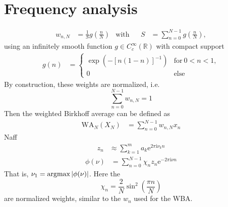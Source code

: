\documentclass[english, parskip=full]{scrartcl}
\title{\titel}
\author{\autor}
\date{\today}
\newcommand{\kla}{}
\newcommand{\klam}{}
\newcommand{\tecxt}{}
\def\I{\text{i}}
\def\E{\text{e}}
\begin{document}
\maketitle  %

\section{Frequency analysis}
\begin{align*}
w_{n,N}&=\frac{1}{S}g\kla\left( {\frac{n}{N}} \right)&\tecxt\text{with}&&S&=\sum_{n=0}^{N-1}g\kla\left( {\frac{n}{N}} \right),
\end{align*} 
using an infinitely smooth function $g\in C^\infty_c (\mathbb{R})$ with compact support
\begin{align*}
g(n)&=\begin{cases}
\exp\kla\left( {-\klam\left[ {n(1-n)} \right]^{-1}} \right)&\tecxt\text{for}\ 0<n<1,\\
0&\tecxt\text{else}
\end{cases}
\end{align*}
By construction, these weights are normalized, i.e. $$\sum_{n=0}^{N-1}w_{n,N}=1$$
Then the weighted Birkhoff average can be defined as
\begin{align*}
\tecxt\text{WA}_N(X_N)&=\sum_{n=0}^{N-1}w_{n,N}x_n
\end{align*}
Naff
\begin{align*}
z_n&\approx\sum_{k= 1}^m a_k\E^{2\pi\I\nu_k n}
\end{align*}
\begin{align*}
\phi(\nu)&=\sum_{n=0}^{N-1}\chi_n z_n \E^{-2\pi\I\nu n}
\end{align*}
That is, $\nu_1=\tecxt\text{argmax\,}\vert\phi(\nu)\vert$.
Here the 
$$\chi_n=\frac{2}{N}\sin^2\kla\left( {\frac{\pi n}{N}} \right)$$ 
are normalized weights, similar to the $w_n$ used for the WBA.
\end{document}
